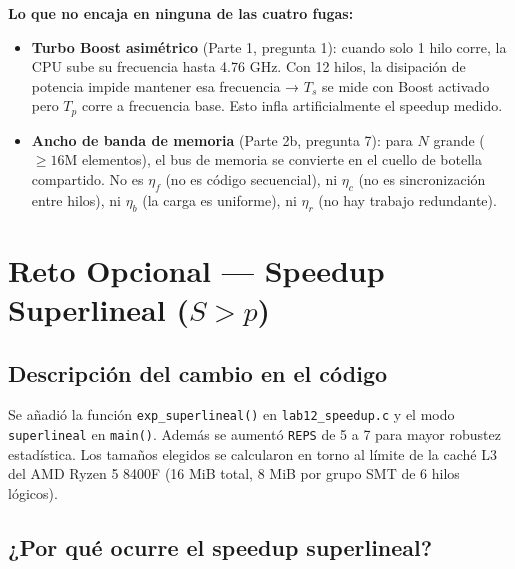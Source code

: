 \documentclass[12pt,letterpaper]{article}
\begin{document}
\textbf{Lo que no encaja en ninguna de las cuatro fugas:}
\begin{itemize}
  \item \textbf{Turbo Boost asimétrico} (Parte 1, pregunta 1): cuando solo 1 hilo corre, la CPU sube su frecuencia hasta 4.76 GHz. Con 12 hilos, la disipación de potencia impide mantener esa frecuencia → $T_s$ se mide con Boost activado pero $T_p$ corre a frecuencia base. Esto infla artificialmente el speedup medido.
  \item \textbf{Ancho de banda de memoria} (Parte 2b, pregunta 7): para $N$ grande ($\geq 16$M elementos), el bus de memoria se convierte en el cuello de botella compartido. No es $\eta_f$ (no es código secuencial), ni $\eta_c$ (no es sincronización entre hilos), ni $\eta_b$ (la carga es uniforme), ni $\eta_r$ (no hay trabajo redundante).
\end{itemize}

\section{Reto Opcional — Speedup Superlineal ($S > p$)}

\subsection{Descripción del cambio en el código}

Se añadió la función \texttt{exp\_superlineal()} en \texttt{lab12\_speedup.c} y el modo \texttt{superlineal} en \texttt{main()}. Además se aumentó \texttt{REPS} de 5 a 7 para mayor robustez estadística. Los tamaños elegidos se calcularon en torno al límite de la caché L3 del AMD Ryzen 5 8400F (16 MiB total, 8 MiB por grupo SMT de 6 hilos lógicos).

\subsection{¿Por qué ocurre el speedup superlineal?}
\end{document}
